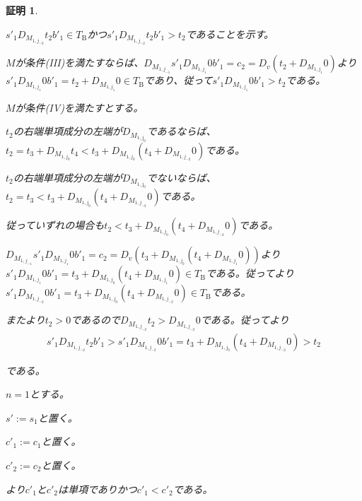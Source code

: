 \documentclass[dvipdfmx,uplatex]{jsarticle}
\theoremstyle{customnonumberbreakfortheorem}
\theoremstyle{customnonumberbreakforproof}
\newtheorem{hideableproof}{証明}
\begin{document}
\begin{hideableproof}
\begin{indented}
\begin{indented}
			\item \(s'_1 D_{M_{1,j_{-2}}} t_2 b'_1 \in T_{\textrm{B}}\)かつ\(s'_1 D_{M_{1,j_{-2}}} t_2 b'_1 > t_2\)であることを示す。
			\item \(M\)が条件(III)を満たすならば、\(D_{M_{1,j_{-1}}} s'_1 D_{M_{1,j_1}} 0 b'_1 = c_2 = D_v(t_2+D_{M_{1,j_1}} 0)\)より\(s'_1 D_{M_{1,j_1}} 0 b'_1 = t_2+D_{M_{1,j_1}} 0 \in T_{\textrm{B}}\)であり、従って\(s'_1 D_{M_{1,j_1}} 0 b'_1 > t_2\)である。
			\item \(M\)が条件(IV)を満たすとする。
			\begin{indented}
				\item \(t_2\)の右端単項成分の左端が\(D_{M_{1,j_0}}\)であるならば、\(t_2 = t_3 + D_{M_{1,j_0}} t_4 < t_3+D_{M_{1,j_0}}(t_4+D_{M_{1,j_{-2}}} 0)\)である。
				\item \(t_2\)の右端単項成分の左端が\(D_{M_{1,j_0}}\)でないならば、\(t_2 = t_3 < t_3+D_{M_{1,j_0}}(t_4+D_{M_{1,j_{-2}}} 0)\)である。
				\item 従っていずれの場合も\(t_2 < t_3+D_{M_{1,j_0}}(t_4+D_{M_{1,j_{-2}}} 0)\)である。
				\item \(D_{M_{1,j_{-1}}} s'_1 D_{M_{1,j_1}} 0 b'_1 = c_2 = D_v(t_3+D_{M_{1,j_0}}(t_4+D_{M_{1,j_1}} 0))\)より\(s'_1 D_{M_{1,j_1}} 0 b'_1 = t_3+D_{M_{1,j_0}}(t_4+D_{M_{1,j_1}} 0) \in T_{\textrm{B}}\)である。従ってより\(s'_1 D_{M_{1,j_{-2}}} 0 b'_1 = t_3+D_{M_{1,j_0}}(t_4+D_{M_{1,j_{-2}}} 0) \in T_{\textrm{B}}\)である。
				\item またより\(t_2 > 0\)であるので\(D_{M_{1,j_{-2}}} t_2 > D_{M_{1,j_{-2}}} 0\)である。従ってより
				\begin{eqnarray*}
				s'_1 D_{M_{1,j_{-2}}} t_2 b'_1 > s'_1 D_{M_{1,j_{-2}}} 0 b'_1 = t_3+D_{M_{1,j_0}}(t_4+D_{M_{1,j_{-2}}} 0) > t_2
				\end{eqnarray*}
				\item である。
			\end{indented}
			\item
			\item \(n = 1\)とする。
			\begin{indented}
				\item \(s' := s_1\)と置く。
				\item \(c'_1 := c_1\)と置く。
				\item \(c'_2 := c_2\)と置く。
				\item {}より\(c'_1\)と\(c'_2\)は単項でありかつ\(c'_1 < c'_2\)である。

\end{indented}
\end{indented}
\end{indented}
\end{hideableproof}
\end{document}
